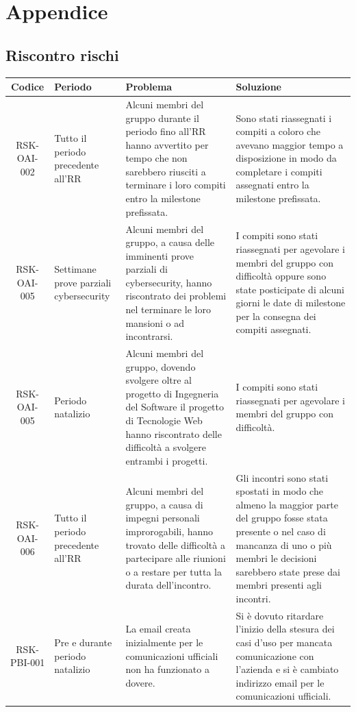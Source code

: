 \section{Appendice}

	\subsection{Riscontro rischi}

		\begin{center}
			\begin{longtable}{|c|p{3cm}|p{4cm}|p{4cm}|}
			\hline
			\rowcolor{lighter-grayer}
			\textbf{Codice} & \textbf{Periodo} & \textbf{Problema} & \textbf{Soluzione} \\
			\hline
			\endfirsthead

			\hline
			RSK-OAI-002 & Tutto il periodo precedente all'RR & Alcuni membri del gruppo durante il periodo fino all'RR hanno avvertito per tempo che non sarebbero riusciti a terminare i loro compiti entro la milestone prefissata. & Sono stati riassegnati i compiti a coloro che avevano maggior tempo a disposizione in modo da completare i compiti assegnati entro la milestone prefissata. \\
			\hline
			\hline
			RSK-OAI-005 & Settimane prove parziali cybersecurity & Alcuni membri del gruppo, a causa delle imminenti prove parziali di cybersecurity, hanno riscontrato dei problemi nel terminare le loro mansioni o ad incontrarsi. & I compiti sono stati riassegnati per agevolare i membri del gruppo con difficoltà oppure sono state posticipate di alcuni giorni le date di milestone per la consegna dei compiti assegnati.  \\
			\hline
			\hline
			RSK-OAI-005 & Periodo natalizio & Alcuni membri del gruppo, dovendo svolgere oltre al progetto di Ingegneria del Software il progetto di Tecnologie Web hanno riscontrato delle difficoltà a svolgere entrambi i progetti. & I compiti sono stati riassegnati per agevolare i membri del gruppo con difficoltà.  \\
			\hline
			\hline
			RSK-OAI-006 & Tutto il periodo precedente all'RR & Alcuni membri del gruppo, a causa di impegni personali improrogabili, hanno trovato delle difficoltà a partecipare alle riunioni o a restare per tutta la durata dell'incontro. & Gli incontri sono stati spostati in modo che almeno la maggior parte del gruppo fosse stata presente o nel caso di mancanza di uno o più membri le decisioni sarebbero state prese dai membri presenti agli incontri. \\
			\hline
			\hline
			RSK-PBI-001 & Pre e durante periodo natalizio & La email creata inizialmente per le comunicazioni ufficiali non ha funzionato a dovere. & Si è dovuto ritardare l'inizio della stesura dei casi d'uso per mancata comunicazione con l'azienda e si è cambiato indirizzo email per le comunicazioni ufficiali. \\
			\hline

			\end{longtable}
		\end{center}


